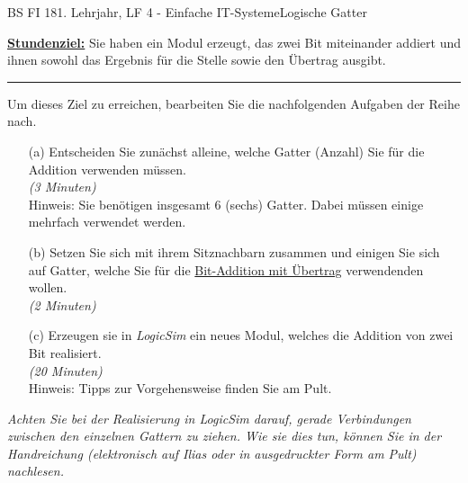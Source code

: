 \documentclass[oneside,openany,headings=optiontotoc,11pt,numbers=noenddot]{scrreprt}
\begin{document}
	\begin{worksheet}{BS FI 18}{1. Lehrjahr, LF 4 - Einfache IT-Systeme}{Logische Gatter}
		\begin{framed}
			\noindent
			\begin{framed}
				\noindent
				\underline{\textbf{Stundenziel:}} Sie haben ein Modul erzeugt, das zwei Bit miteinander addiert und ihnen sowohl das Ergebnis für die Stelle sowie den Übertrag ausgibt.\\
			\end{framed}
			\par\noindent
			\rule{\textwidth}{0.1pt}
			Um dieses Ziel zu erreichen, bearbeiten Sie die nachfolgenden Aufgaben der Reihe nach.\\
			\par\noindent
			\begin{enumerate}
				\item[(a)] Entscheiden Sie zunächst alleine, welche Gatter (Anzahl) Sie für die Addition verwenden müssen.\\
				\textit{(3 Minuten)}\\
				\small{Hinweis: Sie benötigen insgesamt 6 (sechs) Gatter. Dabei müssen einige mehrfach verwendet werden.}\normalsize
				\item[(b)] Setzen Sie sich mit ihrem Sitznachbarn zusammen und einigen Sie sich auf Gatter, welche Sie für die \underline{Bit-Addition mit Übertrag} verwendenden wollen.\\
				\textit{(2 Minuten)}
				\item[(c)] Erzeugen sie in \textit{LogicSim} ein neues Modul, welches die Addition von zwei Bit realisiert.\\
				\textit{(20 Minuten)}\\
				\small{Hinweis: Tipps zur Vorgehensweise finden Sie am Pult.}\normalsize
			\end{enumerate}
			\small{\textit{Achten Sie bei der Realisierung in LogicSim darauf, gerade Verbindungen zwischen den einzelnen Gattern zu ziehen. Wie sie dies tun, können Sie in der Handreichung (elektronisch auf Ilias oder in ausgedruckter Form am Pult) nachlesen.}}
		\end{framed}
	\end{worksheet}
	\pagestyle{empty}
\end{document}
